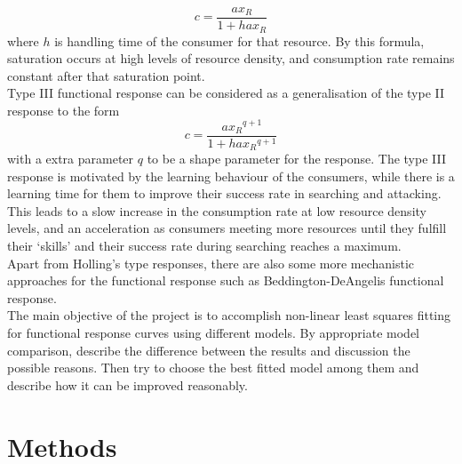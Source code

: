 \documentclass{article}[11pt,a4,twosided,doublespacing,titlepagenumber=on,numbers=endperiod]
\begin{document}
\begin{equation}
    c = \frac{a x_R}{1+ h a x_R}
\end{equation}
where $h$ is handling time of the consumer for that resource. By this formula, saturation occurs at high levels of resource density, and consumption rate remains constant after that saturation point.\\
\noindent
Type III functional response can be considered as a generalisation of the type II response to the form 
\begin{equation}
    c = \frac{a {x_R}^{q+1}}{1 + h a {x_R}^{q+1}}
\end{equation}
with a extra parameter $q$ to be a shape parameter for the response. The type III response is motivated by the learning behaviour of the consumers, while there is a learning time for them to improve their success rate in searching and attacking. This leads to a slow increase in the consumption rate at low resource density levels, and an acceleration as consumers meeting more resources until they fulfill their `skills' and their success rate during searching reaches a maximum.\\
\noindent
Apart from Holling's type responses, there are also some more mechanistic approaches for the functional response such as Beddington-DeAngelis functional response\cite{cantrell2001dynamics}\cite{geritz2012mechanistic}. \\
\noindent
The main objective of the project is to accomplish non-linear least squares fitting for functional response curves using different models. By appropriate model comparison, describe the difference between the results and discussion the possible reasons. Then try to choose the best fitted model among them and describe how it can be improved reasonably. 


\section{Methods}
\end{document}
